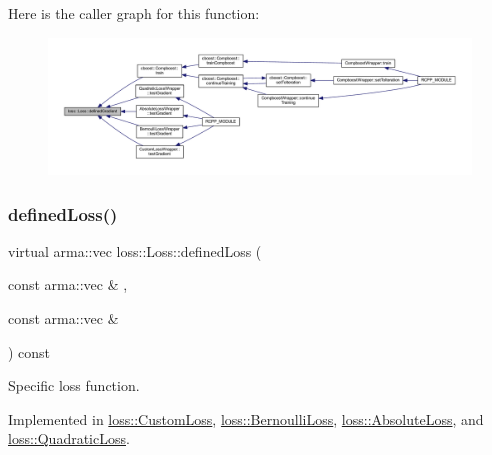 Here is the caller graph for this function\+:\nopagebreak
\begin{figure}[H]
\begin{center}
\leavevmode
\includegraphics[width=350pt]{classloss_1_1_loss_a267a4de70747ade4b2d84ce35a448979_icgraph}
\end{center}
\end{figure}
\mbox{\label{classloss_1_1_loss_ae9f94dd9b8311397583ba3a9cb485e94}} 
\subsubsection{\texorpdfstring{defined\+Loss()}{definedLoss()}}
{\footnotesize\ttfamily virtual arma\+::vec loss\+::\+Loss\+::defined\+Loss (\begin{DoxyParamCaption}\item[{const arma\+::vec \&}]{,  }\item[{const arma\+::vec \&}]{ }\end{DoxyParamCaption}) const\hspace{0.3cm}{\ttfamily [pure virtual]}}



Specific loss function. 



Implemented in \mbox{\hyperlink{classloss_1_1_custom_loss_a2a96bc5e4b4894bbaa64745a3f7c0fd5}{loss\+::\+Custom\+Loss}}, \mbox{\hyperlink{classloss_1_1_bernoulli_loss_a1e347cacc5a5925874f579834f421236}{loss\+::\+Bernoulli\+Loss}}, \mbox{\hyperlink{classloss_1_1_absolute_loss_acfef6f0de3cfcccebd4bbfc04133cf1e}{loss\+::\+Absolute\+Loss}}, and \mbox{\hyperlink{classloss_1_1_quadratic_loss_ae34f68243ffe021e309ed73a68796e1e}{loss\+::\+Quadratic\+Loss}}.


